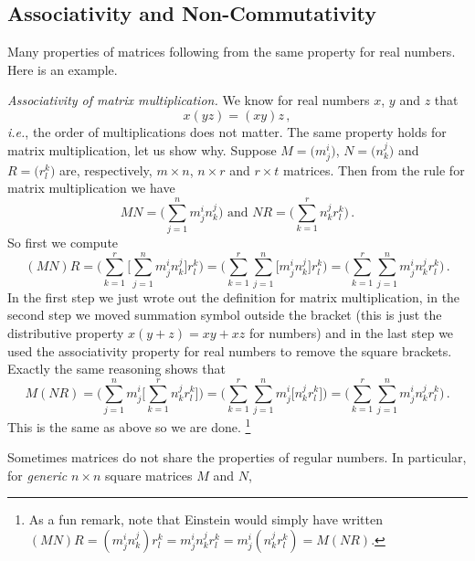 \subsection{Associativity and Non-Commutativity }

Many properties of matrices following from the same property for real numbers. Here is an example.

\begin{example}
{\itshape Associativity of matrix multiplication.} We know for real numbers $x$, $y$ and $z$ that 
\[
x(yz)=(xy)z\, ,
\]
{\itshape i.e.}, the order of multiplications does not matter. The same property holds for matrix multiplication, let us show why.
Suppose $M=\big( m^i_j \big)$, $N=\big( n^j_k \big)$ and  $R=\big( r^k_l \big)$ are, 
respectively, $m\times n$, $n\times r$ and $r\times t$ matrices. Then from the rule for matrix
multiplication we have
\[
MN=\Big(\sum_{j=1}^n m^i_j n^j_k\Big)\mbox{ and } NR=\Big(\sum_{k=1}^r n^j_k r^k_l\Big)\, .
\]
So first we compute 
\[
(MN)R=\Big(\sum_{k=1}^r \Big[\sum_{j=1}^n m^i_j n^j_k\Big] r^k_l \Big) = 
\Big(\sum_{k=1}^r \sum_{j=1}^n \Big[ m^i_j n^j_k\Big] r^k_l \Big) =\Big(\sum_{k=1}^r \sum_{j=1}^n m^i_j n^j_k r^k_l \Big)\, .
\]
In the first step we just wrote out the definition for matrix multiplication, in the second step we
moved summation symbol outside the bracket (this is just the distributive
property $x(y+z)=xy+xz$ for numbers) and
in the last step we used the associativity property for real numbers to remove the square brackets. 
Exactly the same reasoning shows that
\[
M(NR)=\Big(\sum_{j=1}^n m^i_j\Big[\sum_{k=1}^r n^j_k r^k_l\Big]\Big) = 
\Big(\sum_{k=1}^r \sum_{j=1}^n  m^i_j \Big[n^j_kr^k_l \Big] \Big) =\Big(\sum_{k=1}^r \sum_{j=1}^n m^i_j n^j_k r^k_l \Big)\, .
\]
This is the same as above so we are done. \footnote{As a fun remark, note that Einstein would simply have written\\
$(MN)R=(m^i_j n^j_k) r^k_l= m^i_j n^j_k r^k_l = m^i_j (n^j_k r^k_l ) = M(NR)$.}
\end{example}


Sometimes matrices do not share the properties of regular numbers. 
In particular, for {\itshape generic} $n\times n$ square matrices $M$ and $N$, 
\begin{center}
\end{center}




